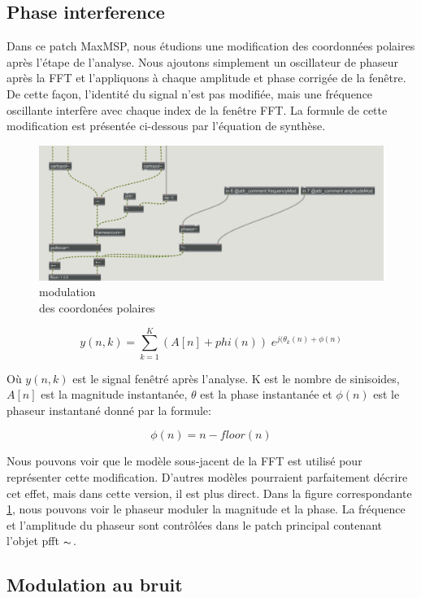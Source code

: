 \subsection{Phase interference}
    Dans ce patch MaxMSP, nous étudions une modification des coordonnées polaires après l’étape de l’analyse. Nous ajoutons simplement un oscillateur de phaseur après la FFT et l’appliquons à chaque amplitude et phase corrigée de la fenêtre. De cette façon, l'identité du signal n'est pas modifiée, mais une fréquence oscillante interfère avec chaque index de la fenêtre FFT. La formule de cette modification est présentée ci-dessous par l'équation de synthèse.

\begin{figure}
  \centering
  \includegraphics[width= 0.5 \textwidth]{Graphs/phasorInt.png}
  \caption{modulation \\ des coordonées polaires}
  \label{phasorInt}
\end{figure}

    \begin{equation}
      y(n, k) = \sum_{k=1}^K (A[n]+phi(n)) \; e^{j (\theta_k(n) +\phi(n)}
    \end{equation}
    
    Où $y (n, k)$ est le signal fenêtré après l'analyse. K est le nombre de sinisoides, $ A [n] $ est la magnitude instantanée, $ \theta $ est la phase instantanée et $ \phi (n) $ est le phaseur instantané donné par la formule:

    \begin{equation*}
        \phi(n) = n - floor(n)
    \end{equation*}

    Nous pouvons voir que le modèle sous-jacent de la FFT est utilisé pour représenter cette modification. D'autres modèles pourraient parfaitement décrire cet effet, mais dans cette version, il est plus direct. Dans la figure correspondante \ref{phasorInt}, nous pouvons voir le phaseur moduler la magnitude et la phase. La fréquence et l'amplitude du phaseur sont contrôlées dans le patch principal contenant l'objet pfft $ \thicksim $.

\subsection{Modulation au bruit}

